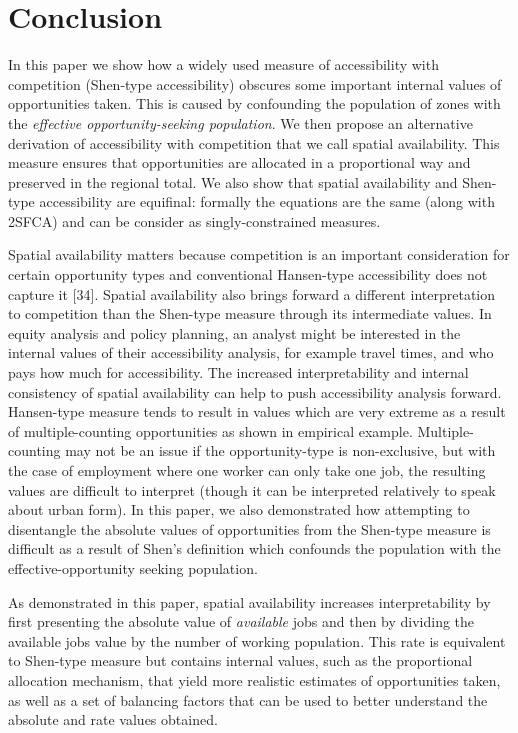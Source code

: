 \documentclass[10pt,letterpaper]{article}
\begin{document}
\newpage

\hypertarget{conclusion}{%
\section{Conclusion}\label{conclusion}}

In this paper we show how a widely used measure of accessibility with
competition (Shen-type accessibility) obscures some important internal
values of opportunities taken. This is caused by confounding the
population of zones with the \emph{effective opportunity-seeking
population}. We then propose an alternative derivation of accessibility
with competition that we call spatial availability. This measure ensures
that opportunities are allocated in a proportional way and preserved in
the regional total. We also show that spatial availability and Shen-type
accessibility are equifinal: formally the equations are the same (along
with 2SFCA) and can be consider as singly-constrained measures.

Spatial availability matters because competition is an important
consideration for certain opportunity types and conventional Hansen-type
accessibility does not capture it {[}34{]}. Spatial availability also
brings forward a different interpretation to competition than the
Shen-type measure through its intermediate values. In equity analysis
and policy planning, an analyst might be interested in the internal
values of their accessibility analysis, for example travel times, and
who pays how much for accessibility. The increased interpretability and
internal consistency of spatial availability can help to push
accessibility analysis forward. Hansen-type measure tends to result in
values which are very extreme as a result of multiple-counting
opportunities as shown in empirical example. Multiple-counting may not
be an issue if the opportunity-type is non-exclusive, but with the case
of employment where one worker can only take one job, the resulting
values are difficult to interpret (though it can be interpreted
relatively to speak about urban form). In this paper, we also
demonstrated how attempting to disentangle the absolute values of
opportunities from the Shen-type measure is difficult as a result of
Shen's definition which confounds the population with the
effective-opportunity seeking population.

As demonstrated in this paper, spatial availability increases
interpretability by first presenting the absolute value of
\emph{available} jobs and then by dividing the available jobs value by
the number of working population. This rate is equivalent to Shen-type
measure but contains internal values, such as the proportional
allocation mechanism, that yield more realistic estimates of
opportunities taken, as well as a set of balancing factors that can be
used to better understand the absolute and rate values obtained.
\end{document}
